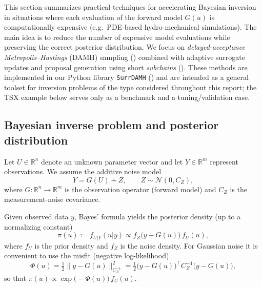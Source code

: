 \label{sec:accelerated_bayes}


This section summarizes practical techniques for accelerating Bayesian inversion in situations where
each evaluation of the forward model $G(u)$ is computationally expensive (e.g.\ PDE-based hydro-mechanical
simulations). The main idea is to reduce the number of expensive model evaluations while preserving
the correct posterior distribution. We focus on \emph{delayed-acceptance Metropolis--Hastings} (DAMH)
sampling (\cite{ChristenFox2005}) combined with adaptive surrogate updates and proposal generation using
short \emph{subchains} (\cite{Subchains}). These methods are implemented in our Python library
\texttt{SurrDAMH} (\cite{surrDAMH}) and are intended as a general toolset for inversion problems of the
type considered throughout this report; the \acrshort{TSX} example below serves only as a benchmark
and a tuning/validation case.

\subsection{Bayesian inverse problem and posterior distribution}
Let $U\in\mathbb{R}^{n}$ denote an unknown parameter vector and let $Y\in\mathbb{R}^{m}$ represent
observations. We assume the additive noise model
\begin{equation}
  Y = G(U) + Z, \qquad Z \sim \mathcal{N}(0, C_Z),
\end{equation}
where $G:\mathbb{R}^{n}\to\mathbb{R}^{m}$ is the observation operator (forward model) and $C_Z$ is
the measurement-noise covariance.

Given observed data $y$, Bayes' formula yields the posterior density (up to a normalizing constant)
\begin{equation}
  \pi(u) := f_{U|Y}(u|y) \propto f_Z\!\bigl(y-G(u)\bigr)\, f_U(u),
\end{equation}
where $f_U$ is the prior density and $f_Z$ is the noise density. For Gaussian noise it is convenient
to use the misfit (negative log-likelihood)
\begin{equation}
  \Phi(u) = \tfrac12 \bigl\|y - G(u)\bigr\|^2_{C_Z^{-1}}
  = \tfrac12 \bigl(y - G(u)\bigr)^\top C_Z^{-1}\bigl(y - G(u)\bigr),
  \label{eq:misfit_phi}
\end{equation}
so that $\pi(u) \propto \exp\!\bigl(-\Phi(u)\bigr)\, f_U(u)$.

